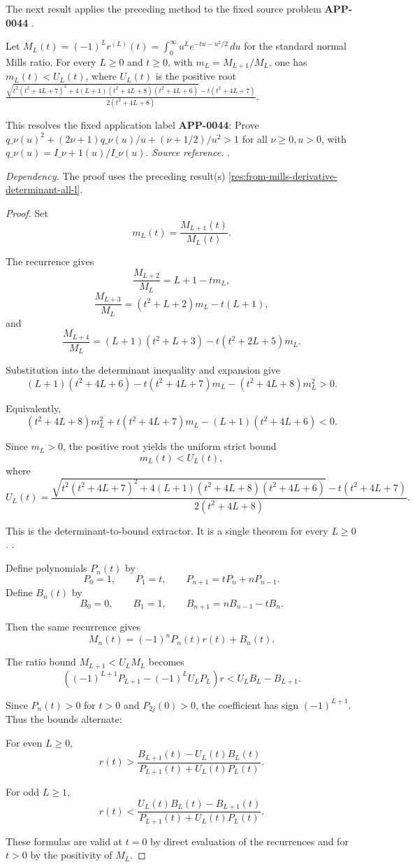 The next result applies the preceding method to the fixed source problem \textbf{APP-0044} \cite{app-app-0042-source}.
\begin{corollary}
\label{res:from-mills-all-l-moment-ratio-quadratic-bound}
Let \(M_L(t)=(-1)^L r^{(L)}(t)=\int_0^\infty u^L e^{-tu-u^2/2}\,du\) for the standard normal Mills ratio. For every \(L\ge0\) and \(t\ge0\), with \(m_L=M_{L+1}/M_L\), one has \(m_L(t)<U_L(t)\), where \(U_L(t)\) is the positive root \(\frac{\sqrt{t^2(t^2+4L+7)^2+4(L+1)(t^2+4L+8)(t^2+4L+6)}-t(t^2+4L+7)}{2(t^2+4L+8)}\).

This resolves the fixed application label \textbf{APP-0044}: Prove \(q\_\nu(u)^2+(2\nu+1)q\_\nu(u)/u+(\nu+1/2)/u^2>1\) for all \(\nu\ge0,u>0\), with \(q\_\nu(u)=I\_{\nu+1}(u)/I\_\nu(u)\).
\emph{Source reference.} \cite{app-app-0042-source}.

\emph{Dependency.} The proof uses the preceding result(s) \ref{res:from-mills-derivative-determinant-all-l}.
\end{corollary}
\begin{proof}
Set
\[
m_L(t)=\frac{M_{L+1}(t)}{M_L(t)}.
\]

The recurrence gives
\[
\frac{M_{L+2}}{M_L}=L+1-tm_L,
\]
\[
\frac{M_{L+3}}{M_L}=(t^2+L+2)m_L-t(L+1),
\]
and
\[
\frac{M_{L+4}}{M_L}=(L+1)(t^2+L+3)-t(t^2+2L+5)m_L.
\]

Substitution into the determinant inequality and expansion give
\[
(L+1)(t^2+4L+6)-t(t^2+4L+7)m_L-(t^2+4L+8)m_L^2>0.
\]

Equivalently,
\[
(t^2+4L+8)m_L^2+t(t^2+4L+7)m_L-(L+1)(t^2+4L+6)<0.
\]

Since \(m_L>0\), the positive root yields the uniform strict bound
\[
m_L(t)<U_L(t),
\]
where
\[
U_L(t)=
\frac{
\sqrt{t^2(t^2+4L+7)^2+4(L+1)(t^2+4L+8)(t^2+4L+6)}
-t(t^2+4L+7)
}
{2(t^2+4L+8)}.
\]

This is the determinant-to-bound extractor. It is a single theorem for every \(L\ge0\). \cite{app-app-0042-source,from-mills}.

Define polynomials \(P_n(t)\) by
\[
P_0=1,\qquad P_1=t,\qquad P_{n+1}=tP_n+nP_{n-1}.
\]
Define \(B_n(t)\) by
\[
B_0=0,\qquad B_1=1,\qquad B_{n+1}=nB_{n-1}-tB_n.
\]

Then the same recurrence gives
\[
M_n(t)=(-1)^nP_n(t)r(t)+B_n(t).
\]

The ratio bound \(M_{L+1}<U_LM_L\) becomes
\[
\left((-1)^{L+1}P_{L+1}-(-1)^L U_LP_L\right)r
<U_LB_L-B_{L+1}.
\]

Since \(P_n(t)>0\) for \(t>0\) and \(P_{2j}(0)>0\), the coefficient has sign \((-1)^{L+1}\). Thus the bounds alternate:

For even \(L\ge0\),
\[
r(t)>
\frac{B_{L+1}(t)-U_L(t)B_L(t)}
{P_{L+1}(t)+U_L(t)P_L(t)}.
\]

For odd \(L\ge1\),
\[
r(t)<
\frac{U_L(t)B_L(t)-B_{L+1}(t)}
{P_{L+1}(t)+U_L(t)P_L(t)}.
\]

These formulas are valid at \(t=0\) by direct evaluation of the recurrences and for \(t>0\) by the positivity of \(M_L\).
\end{proof}

